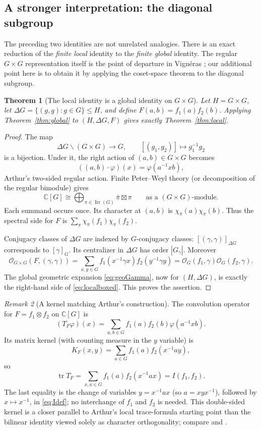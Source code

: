 \documentclass[12pt]{article}
\newtheorem{theorem}{Theorem}[section]
\theoremstyle{remark}
\newtheorem{remark}[theorem]{Remark}
\newcommand{\C}{\mathbb C}
\newcommand{\tr}{\operatorname{tr}}
\newcommand{\Irr}{\operatorname{Irr}}
\newcommand{\Orb}{\mathcal O}
\begin{document}
\subsection{A stronger interpretation: the diagonal subgroup}
The preceding two identities are not unrelated analogies.  There is an
exact reduction of the \emph{finite local} identity to the \emph{finite
global} identity. The regular $G\times G$ representation itself
is the point of departure in Vign\'eras \cite[\S1.1]{Vigneras1991};
our additional point here is to obtain it by applying the
coset-space theorem to the diagonal subgroup.
\begin{theorem}[The local identity is a global identity on
$G\times G$]\label{thm:diagonal}
Let $H=G\times G$, let
$\Delta G=\{(g,g):g\in G\}\leq H$, and define
$F(a,b)=f_1(a)f_2(b)$.  Applying
Theorem~\ref{thm:global} to $(H,\Delta G,F)$ gives exactly
Theorem~\ref{thm:local}.
\end{theorem}
\begin{proof}
The map
\[
 \Delta G\backslash(G\times G)\longrightarrow G,
 \qquad [(g_1,g_2)]\longmapsto g_1^{-1}g_2
\]
is a bijection.  Under it, the right action of $(a,b)\in G\times G$
becomes
\begin{equation}\label{eq:two-sided}
 ((a,b)\cdot\varphi)(x)=\varphi(a^{-1}xb),
\end{equation}
Arthur's two-sided regular action.  Finite Peter--Weyl theory
(or decomposition of the regular bimodule) gives
\begin{equation}\label{eq:peter-weyl}
 \C[G]\cong
   \bigoplus_{\pi\in\Irr(G)}\bar\pi\boxtimes\pi
 \qquad\text{as a $(G\times G)$-module}.
\end{equation}
Each summand occurs once.  Its character at $(a,b)$ is
$\chi_{\bar\pi}(a)\chi_\pi(b)$. Thus the spectral side for $F$ is
$\sum_\pi\chi_{\bar\pi}(f_1)\chi_\pi(f_2)$.

Conjugacy classes of $\Delta G$ are indexed by $G$-conjugacy classes:
$[(\gamma,\gamma)]_{\Delta G}$ corresponds to $[\gamma]_G$.
Its centralizer in $\Delta G$ has order $|G_\gamma|$.  Moreover
\[
 \Orb_{G\times G}(F,(\gamma,\gamma))
 =\sum_{x,y\in G}f_1(x^{-1}\gamma x)f_2(y^{-1}\gamma y)
 =\Orb_G(f_1,\gamma)\Orb_G(f_2,\gamma).
\]
The global geometric expansion \eqref{eq:geoGamma}, now for
$(H,\Delta G)$, is exactly the right-hand side of
\eqref{eq:localboxed}.  This proves the assertion.
\end{proof}
\begin{remark}[A kernel matching Arthur's construction]
The convolution operator for $F=f_1\otimes f_2$ on $\C[G]$ is
\[
 (T_F\varphi)(x)=
 \sum_{a,b\in G}f_1(a)f_2(b)\varphi(a^{-1}xb).
\]
Its matrix kernel (with counting measure in the $y$ variable) is
\[
 K_F(x,y)=\sum_{a\in G}f_1(a)f_2(x^{-1}ay),
\]
so
\[
 \tr T_F=\sum_{x,a\in G}f_1(a)f_2(x^{-1}ax)=I(f_1,f_2).
\]
The last equality is the change of variables $y=x^{-1}ax$
(so $a=xyx^{-1}$), followed by $x\mapsto x^{-1}$, in
\eqref{eq:Idef}; no interchange of $f_1$ and $f_2$ is needed.  This double-sided kernel is a
closer parallel to Arthur's local trace-formula starting point than
the bilinear identity viewed solely as character orthogonality;
compare \cite[\S1.1]{Vigneras1991} and
\cite[\S1]{ArthurTowards1989}.
\end{remark}
\end{document}
